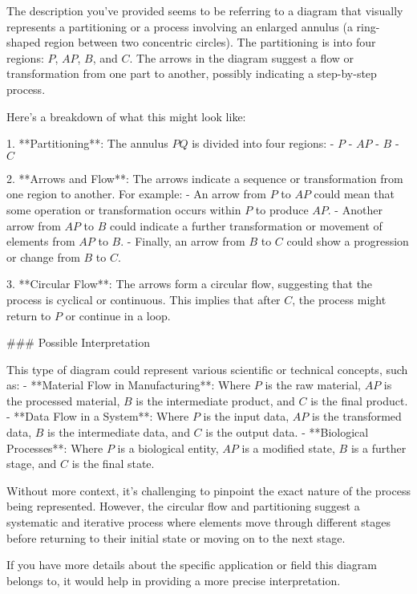 The description you've provided seems to be referring to a diagram that visually represents a partitioning or a process involving an enlarged annulus (a ring-shaped region between two concentric circles). The partitioning is into four regions: \(P\), \(AP\), \(B\), and \(C\). The arrows in the diagram suggest a flow or transformation from one part to another, possibly indicating a step-by-step process.

Here's a breakdown of what this might look like:

1. **Partitioning**: The annulus \(PQ\) is divided into four regions:
   - \(P\)
   - \(AP\)
   - \(B\)
   - \(C\)

2. **Arrows and Flow**: The arrows indicate a sequence or transformation from one region to another. For example:
   - An arrow from \(P\) to \(AP\) could mean that some operation or transformation occurs within \(P\) to produce \(AP\).
   - Another arrow from \(AP\) to \(B\) could indicate a further transformation or movement of elements from \(AP\) to \(B\).
   - Finally, an arrow from \(B\) to \(C\) could show a progression or change from \(B\) to \(C\).

3. **Circular Flow**: The arrows form a circular flow, suggesting that the process is cyclical or continuous. This implies that after \(C\), the process might return to \(P\) or continue in a loop.

### Possible Interpretation

This type of diagram could represent various scientific or technical concepts, such as:
- **Material Flow in Manufacturing**: Where \(P\) is the raw material, \(AP\) is the processed material, \(B\) is the intermediate product, and \(C\) is the final product.
- **Data Flow in a System**: Where \(P\) is the input data, \(AP\) is the transformed data, \(B\) is the intermediate data, and \(C\) is the output data.
- **Biological Processes**: Where \(P\) is a biological entity, \(AP\) is a modified state, \(B\) is a further stage, and \(C\) is the final state.

Without more context, it's challenging to pinpoint the exact nature of the process being represented. However, the circular flow and partitioning suggest a systematic and iterative process where elements move through different stages before returning to their initial state or moving on to the next stage.

If you have more details about the specific application or field this diagram belongs to, it would help in providing a more precise interpretation.